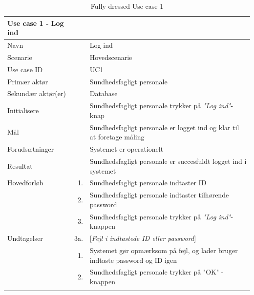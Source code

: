 \begin{longtabu} to 
\toprule
    {\large \textbf{Use case 1 - Log ind}} && \\
    \toprule
    Navn &&    Log ind\\
    Scenarie &&    Hovedscenarie\\
    Use case ID &&    UC1\\
    Primær aktør &&    Sundhedsfagligt personale\\
    Sekundær aktør(er) &&    Database\\
    Initialisere &&    Sundhedsfagligt personale trykker på \textit{"Log ind"}-knap\\
    Mål &&    Sundhedsfagligt personale er logget ind og klar til at foretage måling\\
    Forudsætninger &&    Systemet er operationelt\\
    Resultat &&    Sundhedsfagligt personale er succesfuldt logget ind i systemet\\
    \toprule
    
    Hovedforløb &    1. &    Sundhedsfagligt personale indtaster ID\\[-1ex]
                &    2. &    Sundhedsfagligt personale indtaster tilhørende password\\[-1ex]
                &    3. &    Sundhedsfagligt personale trykker på \textit{"Log ind"}-knappen\\[-1ex]
                            
    \toprule
    Undtagelser &    3a. & [\textit{Fejl i indtastede ID eller password}] \\[-1ex]
    & 1. &  Systemet gør opmærksom på fejl, og lader bruger indtaste password og ID igen\\[-1ex]
    &	2.	&	Sundhedsfagligt personale trykker på "OK"\- -knappen\\[-1ex]
                \toprule
   
\caption{Fully dressed Use case 1}
\label{UC1}
\end{longtabu}
\newpage


